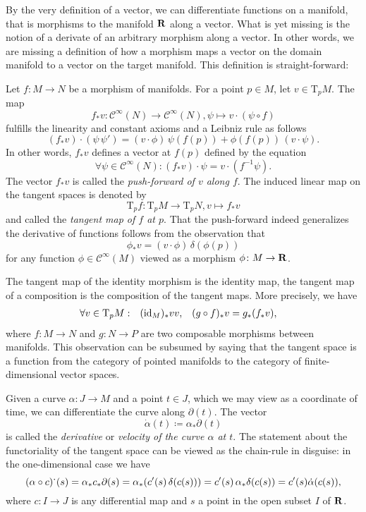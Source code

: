By the very definition of a vector, we can differentiate functions on a 
manifold, that is morphisms to the manifold $\mathbf{R}$ along a vector. What is
yet missing is the notion of a derivate of an arbitrary morphism along a vector.
In other words, we are missing a definition of how a morphism maps a vector on
the domain manifold to a vector on the target manifold. This definition is
straight-forward:

Let $f\colon M \to N$ be a morphism of manifolds. For a point $p \in M$, let
$v \in \mathrm T_p M$. The map
\[
  f_* v\colon \mathcal C^\infty(N) \to \mathcal C^\infty(N), \psi \mapsto
  v \cdot (\psi \circ f)
\]
fulfills the linearity and constant axioms and a Leibniz rule as follows
\[
  (f_* v) \cdot (\psi \, \psi') = (v \cdot \phi) \, \psi(f(p)) +
    \phi(f(p)) \, (v \cdot \psi).
\]
In other words, $f_* v$ defines a vector at $f(p)$ defined by the equation
\[
  \forall \psi \in \mathcal C^\infty(N): (f_* v) \cdot \psi = v \cdot (f^{-1} \psi).
\]
The vector $f_* v$ is called the \emph{push-forward of $v$ along $f$}. The
induced linear map on the tangent spaces is denoted by
\[
  \mathrm T_p f\colon \mathrm T_p M \to \mathrm T_p N, v \mapsto f_* v
\]
and called the \emph{tangent map of $f$ at $p$}. That the push-forward
indeed generalizes the derivative of functions follows from the observation that
\[
  \phi_* v = (v \cdot \phi) \, \delta(\phi(p))
\]
for any function $\phi \in \mathcal C^\infty(M)$ viewed as a morphism
$\phi\colon M \to \mathbf{R}$.

The tangent map of the identity morphism is the identity map, the tangent map
of a composition is the composition of the tangent maps. More precisely, we
have
\[
  \begin{aligned}
    \forall v \in \mathrm T_p M: &&
    (\mathrm{id}_M)_* v & v, &
    (g \circ f)_* v & = g_* (f_* v),
  \end{aligned}
\]
where $f\colon M \to N$ and $g\colon N \to P$ are two composable morphisms
between manifolds. This observation can be subsumed by saying that the
tangent space is a function from the category of pointed manifolds to the
category of finite-dimensional vector spaces. 

Given a curve $\alpha\colon J \to M$ and a point $t \in J$, which we may view
as a coordinate of time, we can differentiate the curve along $\partial(t)$.
The vector
\[
  \dot\alpha(t) \coloneqq \alpha_* \partial(t)
\]
is called the \emph{derivative} or \emph{velocity of the curve $\alpha$ at $t$}.
The statement about the functoriality of the tangent space can be viewed as the
chain-rule in disguise: in the one-dimensional case we have
\[
  (\alpha \circ c)\spdot(s) = \alpha_* c_* \partial(s)
  = \alpha_* (c'(s) \, \delta(c(s)))
  = c'(s) \, \alpha_* \delta(c(s)) = c'(s) \dot\alpha(c(s)),
\]
where $c\colon I \to J$ is any differential map and $s$ a point in the open
subset $I$ of $\mathbf{R}$.

